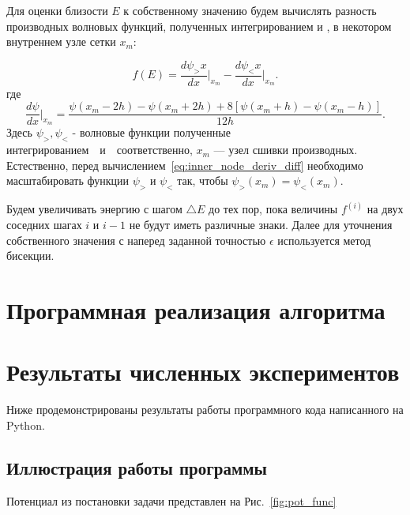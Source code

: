 \documentclass[a4paper,12pt]{article}
\begin{document}
Для оценки близости $E$ к собственному значению будем вычислять разность производных волновых функций, полученных интегрированием \guillemetright и \guillemetright, в некотором внутреннем узле сетки $x_m$:

\begin{equation}
    f(E) = \frac{d\psi_>x}{dx}\bigg|_{x_m} - \frac{d\psi_<x}{dx}\bigg|_{x_m}.
    \label{eq:inner_node_deriv_diff}
\end{equation}
где
\begin{equation}
    \frac{d\psi}{dx}\bigg|_{x_m} =\frac{\psi(x_m-2h) - \psi(x_m+2h) + 8\left[ \psi(x_m + h) - \psi(x_m - h) \right]}{12h}.
    \label{eq:inner_node_deriv_diff_expl}
\end{equation}
Здесь $\psi_>, \psi_<$ - волновые функции полученные интегрированием~\guillemetright~и~\guillemetright~соответственно, $x_m$ --- узел сшивки производных.
Естественно, перед вычислением~\eqref{eq:inner_node_deriv_diff} необходимо масштабировать функции $\psi_>$ и $\psi_<$ так, чтобы $\psi_>(x_m)=\psi_<(x_m)$.

Будем увеличивать энергию с шагом $\triangle E$ до тех пор, пока величины $f^{(i)}$ на двух соседних шагах $i$ и $i - 1$ не будут иметь различные знаки.
Далее для уточнения собственного значения с наперед заданной точностью $\epsilon$ используется метод бисекции.

\newpage

\section{Программная реализация алгоритма}\label{sec:--}


\section{Результаты численных экспериментов}\label{sec:results}

Ниже продемонстрированы результаты работы программного кода написанного на Python.

\subsection{Иллюстрация работы программы}\label{subsec:results_images}

Потенциал из постановки задачи представлен на Рис.~\ref{fig:pot_func}
\end{document}
